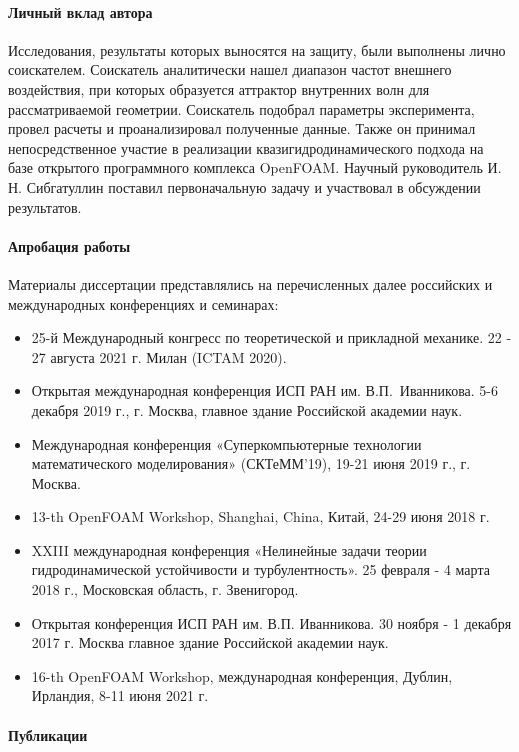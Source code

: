 \documentclass[utf8x]{G7-32} %
\begin{document}
\paragraph{Личный вклад автора}

Исследования, результаты которых выносятся на защиту, были выполнены лично соискателем. Соискатель аналитически нашел диапазон частот внешнего воздействия, при которых образуется аттрактор внутренних волн для рассматриваемой геометрии. Соискатель подобрал параметры эксперимента, провел расчеты и проанализировал полученные данные. Также он принимал непосредственное участие в реализации квазигидродинамического подхода на базе открытого программного комплекса OpenFOAM. Научный руководитель И. Н. Сибгатуллин поставил первоначальную задачу и участвовал в обсуждении результатов. 

\paragraph{Апробация работы}

Материалы диссертации представлялись на перечисленных далее российских и международных конференциях и семинарах:

\begin{itemize}
  \item 25-й Международный конгресс по теоретической и прикладной механике. 22 - 27 августа 2021 г. Милан (ICTAM 2020).
  \item Открытая международная конференция ИСП РАН им. В.П.~Иванникова. 5-6 декабря 2019 г., г. Москва, главное здание Российской академии наук.
  \item Международная конференция «Суперкомпьютерные технологии математического моделирования» (СКТеММ’19), 19-21 июня 2019 г., г. Москва.
  \item 13-th OpenFOAM Workshop, Shanghai, China, Китай, 24-29 июня 2018 г.
  \item XXIII международная конференция «Нелинейные задачи теории гидродинамической устойчивости и турбулентность». 25 февраля - 4 марта 2018 г., Московская область, г. Звенигород.
  \item Открытая конференция ИСП РАН им. В.П. Иванникова. 30 ноября - 1 декабря 2017 г. Москва главное здание Российской академии наук.
  \item 16-th OpenFOAM Workshop, международная конференция, Дублин, Ирландия, 8-11 июня 2021 г. 
\end{itemize}

\paragraph{Публикации}
\end{document}
